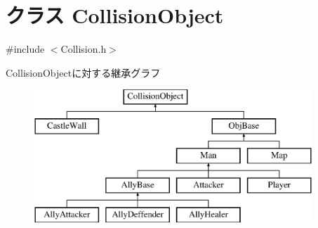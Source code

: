 \hypertarget{class_collision_object}{\section{クラス Collision\-Object}
\label{class_collision_object}
}


{\ttfamily \#include $<$Collision.\-h$>$}

Collision\-Objectに対する継承グラフ\begin{figure}[H]
\begin{center}
\leavevmode
\includegraphics[height=5.000000cm]{d3/d62/class_collision_object}
\end{center}
\end{figure}
